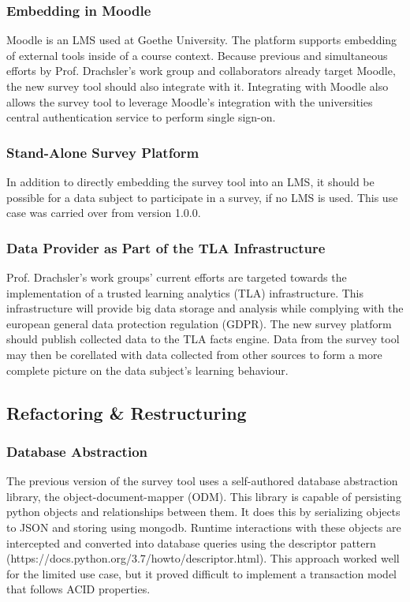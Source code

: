\documentclass[a4paper,11pt]{article}
\begin{document}
                \subsubsection{Embedding in Moodle}
                Moodle is an LMS used at Goethe University. The platform supports embedding of external
                tools inside of a course context. Because previous and simultaneous efforts by Prof. Drachsler's
                work group and collaborators already target Moodle, the new survey tool should also integrate
                with it. Integrating with Moodle also allows the survey tool to leverage
                Moodle's integration with the universities central authentication service
                to perform single sign-on.
            
                \subsubsection{Stand-Alone Survey Platform}
                In addition to directly embedding the survey tool into an LMS, it should be possible
                for a data subject to participate in a survey, if no LMS is used.
                This use case was carried over from version 1.0.0.

                \subsubsection{Data Provider as Part of the TLA Infrastructure}
                Prof. Drachsler's work groups' current efforts are targeted towards the implementation
                of a trusted learning analytics (TLA) infrastructure. This infrastructure will
                provide big data storage and analysis while complying with the european general
                data protection regulation (GDPR). The new survey platform should publish collected data
                to the TLA facts engine. Data from the survey tool may then be corellated
                with data collected from other sources to form a more complete picture
                on the data subject's learning behaviour.

        \subsection{Refactoring \& Restructuring}
           \subsubsection{Database Abstraction}
           The previous version of the survey tool uses a self-authored database abstraction library,
           the object-document-mapper (ODM). This library is capable of persisting python objects
           and relationships between them. It does this by serializing objects to JSON and storing 
           using mongodb. Runtime interactions with these objects are intercepted and converted into 
           database queries using the descriptor pattern (https://docs.python.org/3.7/howto/descriptor.html).
           This approach worked well for the limited use case, but it proved difficult to implement
           a transaction model that follows ACID properties.
\end{document}
